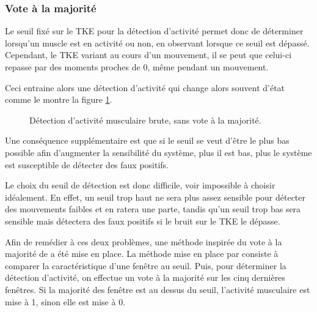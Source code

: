 \documentclass[letterpaper, twoside, 12pt, memoire, creativecommons, hyperref]{thETS}
\begin{document}
\subsubsection{Vote à la majorité}

Le seuil fixé sur le TKE pour la détection d'activité permet donc de déterminer lorsqu'un muscle est en activité ou non, en observant lorsque ce seuil est dépassé. Cependant, le TKE variant au cours d'un mouvement, il se peut que celui-ci repasse par des moments proches de 0, même pendant un mouvement.

Ceci entraine alors une détection d'activité qui change alors souvent d'état comme le montre la figure \ref{fig:onsetSansVote}.

\begin{figure}
	\centering
	\caption{Détection d'activité musculaire brute, sans vote à la majorité.}
	\label{fig:onsetSansVote}
\end{figure}

Une conséquence supplémentaire est que si le seuil se veut d'être le plus bas possible afin d'augmenter la sensibilité du système, plus il est bas, plus le système est susceptible de détecter des faux positifs. 

Le choix du seuil de détection est donc difficile, voir impossible à choisir idéalement. En effet, un seuil trop haut ne sera plus assez sensible pour détecter des mouvements faibles et en ratera une parte, tandis qu'un seuil trop bas sera sensible mais détectera des faux positifs si le bruit sur le TKE le dépasse.

Afin de remédier à ces deux problèmes, une méthode inspirée du vote à la majorité de \cite{Chang1996} a été mise en place. La méthode mise en place par \cite{Chang1996} consiste à comparer la caractéristique d'une fenêtre au seuil. Puis, pour déterminer la détection d'activité, on effectue un vote à la majorité sur les cinq dernières fenêtres. Si la majorité des fenêtre est au dessus du seuil, l'activité musculaire est mise à 1, sinon elle est mise à 0.
\end{document}
